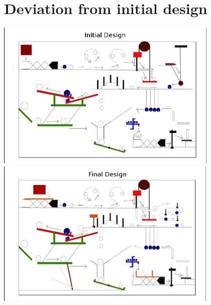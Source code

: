 \documentclass[11pt]{article}
\begin{document}
\section{Deviation from initial design}
\begin{center}
 \includegraphics[width=0.8\textwidth,keepaspectratio]{img/design_directions.png}\\
 \includegraphics[width=0.8\textwidth,keepaspectratio]{img/design_new_directions.png}
\end{center}
\end{document}
